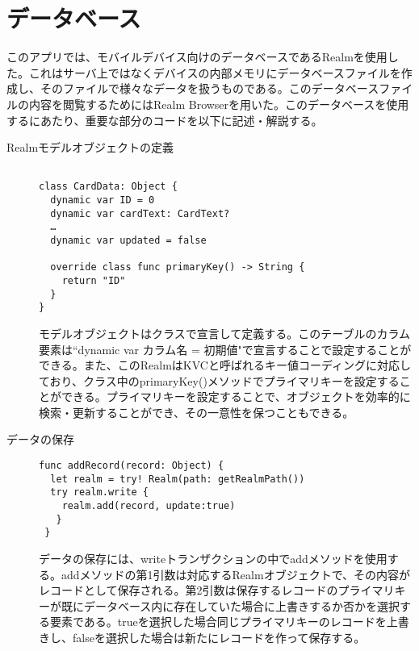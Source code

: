 \section{データベース}
このアプリでは、モバイルデバイス向けのデータベースであるRealmを使用した\cite{REALM}。これはサーバ上ではなくデバイスの内部メモリにデータベースファイルを作成し、そのファイルで様々なデータを扱うものである。このデータベースファイルの内容を閲覧するためにはRealm Browserを用いた。このデータベースを使用するにあたり、重要な部分のコードを以下に記述・解説する。
 
\begin{description}
\item[Realmモデルオブジェクトの定義]\mbox{} 
\begin{lstlisting}[basicstyle=\ttfamily\footnotesize, frame=single]
 
class CardData: Object {   
  dynamic var ID = 0
  dynamic var cardText: CardText?
  …
  dynamic var updated = false

  override class func primaryKey() -> String {
    return "ID"
  }
}
 \end{lstlisting}
 
モデルオブジェクトはクラスで宣言して定義する。このテーブルのカラム要素は``dynamic var カラム名 = 初期値"で宣言することで設定することができる。また、このRealmはKVCと呼ばれるキー値コーディングに対応しており、クラス中のprimaryKey()メソッドでプライマリキーを設定することができる。プライマリキーを設定することで、オブジェクトを効率的に検索・更新することができ、その一意性を保つこともできる。
\end{description}
 
\begin{description}
\item[データの保存]\mbox{} 
\begin{lstlisting}[basicstyle=\ttfamily\footnotesize, frame=single]
func addRecord(record: Object) {
  let realm = try! Realm(path: getRealmPath())
  try realm.write {
    realm.add(record, update:true)
   }
 }
\end{lstlisting}
 
データの保存には、writeトランザクションの中でaddメソッドを使用する。addメソッドの第1引数は対応するRealmオブジェクトで、その内容がレコードとして保存される。第2引数は保存するレコードのプライマリキーが既にデータベース内に存在していた場合に上書きするか否かを選択する要素である。trueを選択した場合同じプライマリキーのレコードを上書きし、falseを選択した場合は新たにレコードを作って保存する。
\end{description}
 
